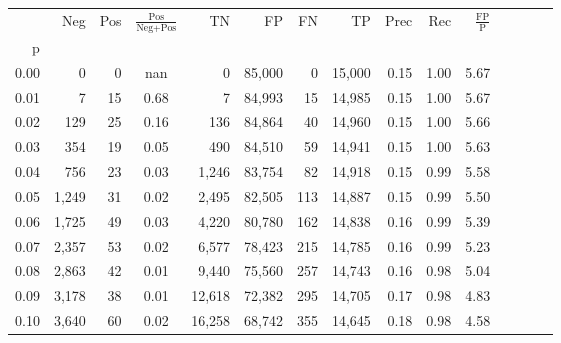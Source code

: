 \begin{tabular}{rrrcrrrrrrrrrrr}
\toprule
{} &    Neg &  Pos & $\frac{\text{Pos}}{\text{Neg}+\text{Pos}}$ &      TN &      FP &      FN &      TP &  Prec &   Rec & $\frac{\text{FP}}{\text{P}}$ \\
p    &        &      &                                            &         &         &         &         &       &       &                              \\
\midrule
0.00 &      0 &    0 &                                        nan &       0 &  85,000 &       0 &  15,000 &  0.15 &  1.00 &                         5.67 \\
0.01 &      7 &   15 &                                       0.68 &       7 &  84,993 &      15 &  14,985 &  0.15 &  1.00 &                         5.67 \\
0.02 &    129 &   25 &                                       0.16 &     136 &  84,864 &      40 &  14,960 &  0.15 &  1.00 &                         5.66 \\
0.03 &    354 &   19 &                                       0.05 &     490 &  84,510 &      59 &  14,941 &  0.15 &  1.00 &                         5.63 \\
0.04 &    756 &   23 &                                       0.03 &   1,246 &  83,754 &      82 &  14,918 &  0.15 &  0.99 &                         5.58 \\
0.05 &  1,249 &   31 &                                       0.02 &   2,495 &  82,505 &     113 &  14,887 &  0.15 &  0.99 &                         5.50 \\
0.06 &  1,725 &   49 &                                       0.03 &   4,220 &  80,780 &     162 &  14,838 &  0.16 &  0.99 &                         5.39 \\
0.07 &  2,357 &   53 &                                       0.02 &   6,577 &  78,423 &     215 &  14,785 &  0.16 &  0.99 &                         5.23 \\
0.08 &  2,863 &   42 &                                       0.01 &   9,440 &  75,560 &     257 &  14,743 &  0.16 &  0.98 &                         5.04 \\
0.09 &  3,178 &   38 &                                       0.01 &  12,618 &  72,382 &     295 &  14,705 &  0.17 &  0.98 &                         4.83 \\
0.10 &  3,640 &   60 &                                       0.02 &  16,258 &  68,742 &     355 &  14,645 &  0.18 &  0.98 &                         4.58 \\

\end{tabular}
